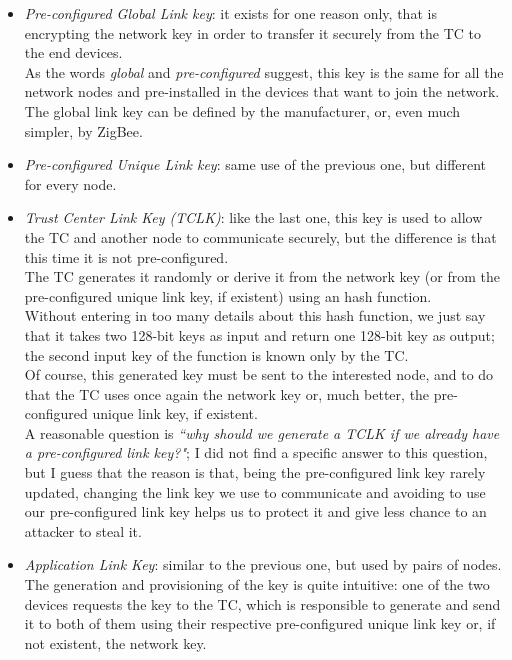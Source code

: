\documentclass[12pt]{report}
\begin{document}
\begin{itemize}
\begin{itemize}
\item \emph{Pre-configured Global Link key}: it exists for one reason only, that is encrypting the network key in order to transfer it securely from the TC to the end devices.\\
As the words \emph{global} and \emph{pre-configured} suggest, this key is the same for all the network nodes and pre-installed in the devices that want to join the network.\\
The global link key can be defined by the manufacturer, or, even much simpler, by ZigBee.
\item \emph{Pre-configured Unique Link key}: same use of the previous one, but different for every node.
\item \emph{Trust Center Link Key (TCLK)}: like the last one, this key is used to allow the TC and another node to communicate securely, but the difference is that this time it is not pre-configured.\\
The TC generates it randomly or derive it from the network key (or from the pre-configured unique link key, if existent) using an hash function.\\ 
Without entering in too many details about this hash function, we just say that it takes two 128-bit keys as input and return one 128-bit key as output; the second input key of the function is known only by the TC.\\
Of course, this generated key must be sent to the interested node, and to do that the TC uses once again the network key or, much better, the pre-configured unique link key, if existent.\\

A reasonable question is \emph{``why should we generate a TCLK if we already have a pre-configured link key?"}; I did not find a specific answer to this question, but I guess that the reason is that, being the pre-configured link key rarely updated, changing the link key we use to communicate and avoiding to use our pre-configured link key helps us to protect it and give less chance to an attacker to steal it.
\item \emph{Application Link Key}: similar to the previous one, but used by pairs of nodes.\\
The generation and provisioning of the key is quite intuitive: one of the two devices requests the key to the TC, which is responsible to generate and send it to both of them using their respective pre-configured unique link key or, if not existent, the network key.
\end{itemize}


\end{itemize}
\end{document}
